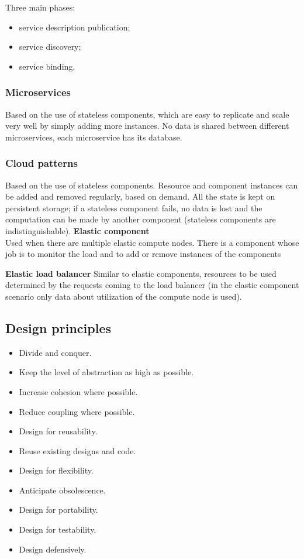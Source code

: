 Three main phases:
\begin{itemize}
    \item service description publication;
    \item service discovery;
    \item service binding.
\end{itemize}

\subsubsection{Microservices}
Based on the use of stateless components, which are easy to replicate and scale very well by simply adding more instances.
No data is shared between different microservices, each microservice has its database.

\subsubsection{Cloud patterns}
Based on the use of stateless components.
Resource and component instances can be added and removed regularly, based on demand.
All the state is kept on persistent storage; if a stateless component fails, no data is lost and the computation can be made by another component (stateless components are indistinguishable).
\textbf{Elastic component}\\
Used when there are multiple elastic compute nodes.
There is a component whose job is to monitor the load and to add or remove instances of the components

\textbf{Elastic load balancer}
Similar to elastic components, resources to be used determined by the requests coming to the load balancer (in the elastic component scenario only data about utilization of the compute node is used).

\subsection{Design principles}
\begin{itemize}
    \item Divide and conquer.
    \item Keep the level of abstraction as high as possible.
    \item Increase cohesion where possible.
    \item Reduce coupling  where possible.
    \item Design for reusability.
    \item Reuse existing designs and code.
    \item Design for flexibility.
    \item Anticipate obsolescence.
    \item Design for portability.
    \item Design for testability.
    \item Design defensively.
\end{itemize}

